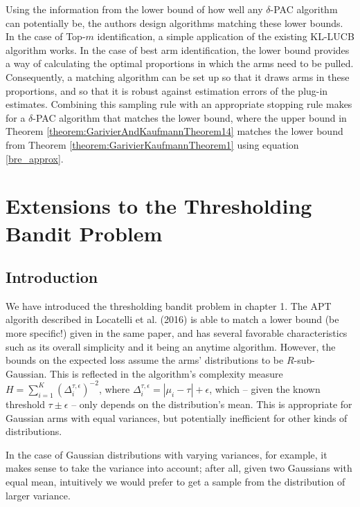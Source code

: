 \documentclass[12pt,]{article}
\begin{document}
Using the information from the lower bound of how well any
\(\delta\)-PAC algorithm can potentially be, the authors design
algorithms matching these lower bounds. In the case of Top-\(m\)
identification, a simple application of the existing KL-LUCB algorithm
works. In the case of best arm identification, the lower bound provides
a way of calculating the optimal proportions in which the arms need to
be pulled. Consequently, a matching algorithm can be set up so that it
draws arms in these proportions, and so that it is robust against
estimation errors of the plug-in estimates. Combining this sampling rule
with an appropriate stopping rule makes for a \(\delta\)-PAC algorithm
that matches the lower bound, where the upper bound in Theorem
\ref{theorem:GarivierAndKaufmannTheorem14} matches the lower bound from
Theorem \ref{theorem:GarivierKaufmannTheorem1} using equation
\eqref{bre_approx}.

\newpage

\section{Extensions to the Thresholding Bandit
Problem}\label{extensions-to-the-thresholding-bandit-problem}

\subsection{Introduction}\label{introduction-1}

We have introduced the thresholding bandit problem in chapter 1. The APT
algorith described in Locatelli et al. (2016) is able to match a lower
bound (be more specific!) given in the same paper, and has several
favorable characteristics such as its overall simplicity and it being an
anytime algorithm. However, the bounds on the expected loss assume the
arms' distributions to be \(R\)-sub-Gaussian. This is reflected in the
algorithm's complexity measure
\(H = \sum_{i=1}^K (\Delta_i^{\tau, \epsilon})^{-2}\), where
\(\Delta_i^{\tau,\epsilon} = |\mu_i - \tau| + \epsilon\), which -- given
the known threshold \(\tau \pm \epsilon\) -- only depends on the
distribution's mean. This is appropriate for Gaussian arms with equal
variances, but potentially inefficient for other kinds of distributions.

In the case of Gaussian distributions with varying variances, for
example, it makes sense to take the variance into account; after all,
given two Gaussians with equal mean, intuitively we would prefer to get
a sample from the distribution of larger variance.
\end{document}
